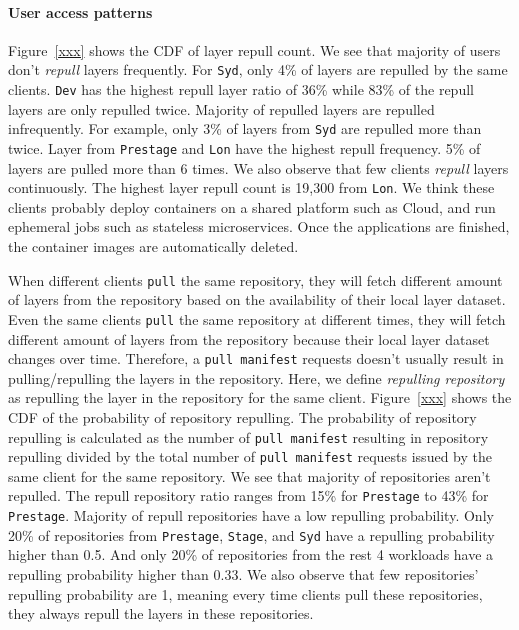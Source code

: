 \paragraph{User access patterns}
Figure~\ref{xxx} shows the CDF of layer repull count.
We see that majority of users don't \emph{repull} layers frequently.
For \texttt{Syd}, only 4\% of layers are repulled by the same clients.
\texttt{Dev} has the highest repull layer ratio of 36\% while 83\% of the repull layers are only repulled twice.
Majority of repulled layers are repulled infrequently.
For example, only 3\% of layers from \texttt{Syd} are repulled more than twice.
Layer from \texttt{Prestage} and \texttt{Lon} have the highest repull frequency.
5\% of layers are pulled more than 6 times.
We also observe that few clients \emph{repull} layers continuously.
The highest layer repull count is 19,300 from \texttt{Lon}.
We think these clients probably deploy containers on a shared platform such as Cloud,
and run ephemeral jobs such as stateless microservices. 
Once the applications are finished, the container images are automatically deleted.

When different clients \texttt{pull} the same repository, 
they will fetch different amount of layers from the repository based on the availability of their local layer dataset.
Even the same clients \texttt{pull} the same repository at different times, 
they will fetch different amount of layers from the repository because their local layer dataset changes over time.
Therefore, a \texttt{pull manifest} requests doesn't usually result in pulling/repulling the layers in the repository. 
Here, we define \emph{repulling repository} as 
repulling the layer in the repository for the same client.
Figure~\ref{xxx} shows the CDF of the probability of repository repulling.
The probability of repository repulling is calculated 
as the number of \texttt{pull manifest} resulting in repository repulling divided by 
the total number of \texttt{pull manifest} requests issued by the same client for the same repository.
We see that majority of repositories aren't repulled.
The repull repository ratio ranges from 15\% for \texttt{Prestage} to 43\% for \texttt{Prestage}.
Majority of repull repositories have a low repulling probability.
Only 20\% of repositories from  \texttt{Prestage}, \texttt{Stage}, and 
\texttt{Syd} have a repulling probability higher than 0.5.
And only 20\% of repositories from the rest 4 workloads have a repulling probability higher than 0.33.
We also observe that few repositories' repulling probability are 1, meaning 
every time clients pull these repositories, they always repull the layers in these repositories. 
 
